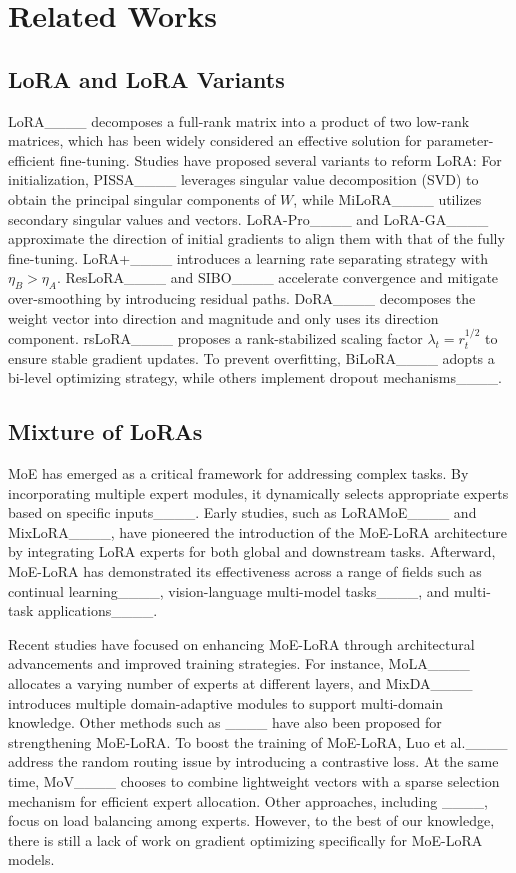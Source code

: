 \section{Related Works}
\subsection{LoRA and LoRA Variants}
LoRA____ decomposes a full-rank matrix into a product of two low-rank matrices, which has been widely considered an effective solution for parameter-efficient fine-tuning. Studies have proposed several variants to reform LoRA: For initialization, PISSA____ leverages singular value decomposition (SVD) to obtain the principal singular components of $W$, while MiLoRA____ utilizes secondary singular values and vectors. LoRA-Pro____ and LoRA-GA____ approximate the direction of initial gradients to align them with that of the fully fine-tuning. LoRA+____ introduces a learning rate separating strategy with $\eta_B > \eta_A$. ResLoRA____ and SIBO____ accelerate convergence and mitigate over-smoothing by introducing residual paths. DoRA____ decomposes the weight vector into direction and magnitude and only uses its direction component. rsLoRA____ proposes a rank-stabilized scaling factor $\lambda_t = r_t^{1/2}$ to ensure stable gradient updates. To prevent overfitting, BiLoRA____ adopts a bi-level optimizing strategy, while others implement dropout mechanisms____.

\subsection{Mixture of LoRAs}
MoE has emerged as a critical framework for addressing complex tasks. By incorporating multiple expert modules, it dynamically selects appropriate experts based on specific inputs____. Early studies, such as LoRAMoE____ and MixLoRA____, have pioneered the introduction of the MoE-LoRA architecture by integrating LoRA experts for both global and downstream tasks. Afterward, MoE-LoRA has demonstrated its effectiveness across a range of fields such as continual learning____, vision-language multi-model tasks____, and multi-task applications____.

Recent studies have focused on enhancing MoE-LoRA through architectural advancements and improved training strategies. For instance, MoLA____ allocates a varying number of experts at different layers, and MixDA____ introduces multiple domain-adaptive modules to support multi-domain knowledge. Other methods such as ____ have also been proposed for strengthening MoE-LoRA. To boost the training of MoE-LoRA, Luo et al.____ address the random routing issue by introducing a contrastive loss. At the same time, MoV____ chooses to combine lightweight vectors with a sparse selection mechanism for efficient expert allocation. Other approaches, including ____, focus on load balancing among experts. However, to the best of our knowledge, there is still a lack of work on gradient optimizing specifically for MoE-LoRA models. 

